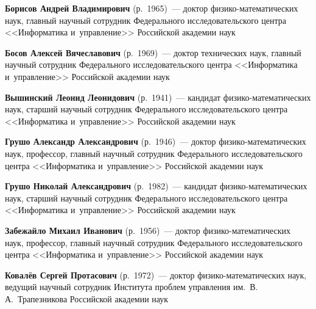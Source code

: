 \begin{multicols}{2}







\noindent
\textbf{Борисов Андрей Владимирович} (р.\ 1965)~--- 
доктор фи\-зи\-ко-ма\-те\-ма\-ти\-че\-ских наук, глав\-ный научный сотрудник Федерального исследовательского цент\-ра 
<<Информатика и~управ\-ле\-ние>> Российской академии наук

\vspace*{2pt}

\noindent
\textbf{Босов Алексей Вячеславович} (р.\ 1969)~---
 доктор технических наук, главный научный сотрудник Федерального исследовательского цент\-ра <<Информатика и~управ\-ле\-ние>>
  Российской академии наук

\vspace*{2pt}

\noindent
\textbf{Вышинский Леонид Леонидович} (р.\ 1941)~--- 
кандидат фи\-зи\-ко-ма\-те\-ма\-ти\-че\-ских наук, 
старший научный сотрудник Федерального исследовательского цент\-ра <<Информатика и~управ\-ле\-ние>> Российской академии наук 

\vspace*{2pt}

\noindent
\textbf{Грушо Александр Александрович} (р.\ 1946)~--- доктор фи\-зи\-ко-ма\-те\-ма\-ти\-че\-ских наук, 
профессор, главный научный сотрудник Федерального исследовательского цент\-ра <<Информатика и~управ\-ле\-ние>>
 Российской академии наук

\vspace*{2pt}

\noindent
\textbf{Грушо Николай Александрович} (р.\ 1982)~--- кандидат фи\-зи\-ко-ма\-те\-ма\-ти\-че\-ских наук, 
старший научный сотрудник Федерального исследовательского цент\-ра <<Информатика и~управ\-ле\-ние>> Российской академии наук

\vspace*{2pt}

\noindent
\textbf{Забежайло Михаил Иванович} (р.\ 1956)~--- доктор фи\-зи\-ко-ма\-те\-ма\-ти\-че\-ских наук, 
профессор, главный научный сотрудник Федерального исследовательского цент\-ра <<Информатика и~управ\-ле\-ние>> Российской академии наук

\vspace*{2pt}

\noindent
\textbf{Ковалёв Сергей Протасович} (р.\ 1972)~--- доктор фи\-зи\-ко-ма\-те\-ма\-ти\-че\-ских наук, 
ведущий научный сотрудник Института проб\-лем управ\-ле\-ния им.\ В.\,А.~Трапезникова Российской академии наук


\end{multicols}
